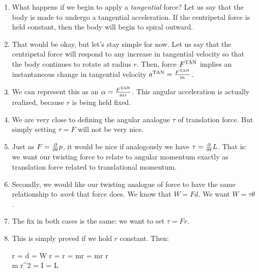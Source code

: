 \begin{enumerate}

  \item What happens if we begin to apply a \emph{tangential} force? Let
  us say that the body is made to undergo a tangential acceleration. If
  the centripetal force is held constant, then the body will begin to
  spiral outward.

  \item That would be okay, but let's stay simple for now. Let us say
  that the centripetal force will respond to any increase in tangential
  velocity so that the body continues to rotate at radius $r$. Then,
  force $F^{\text{TAN}}$ implies an instantaneous change in tangential velocity
  $a^{\text{TAN}} = \frac{F^{\text{TAN}}}{m}$.

  \item We can represent this as an 
  $\alpha = \frac{F^{\text{TAN}}}{mr}$. This angular acceleration is actually
  realized, because $r$ is being held fixed.

  \item We are very close to defining the angular analogue $\tau$ of
  translation force. But simply setting $\tau = F$ will not be very
  nice.

  \item Just as $F = \frac{\partial }{\partial t} p$, it would be nice if analogously we
  have $\tau = \frac{\partial }{\partial t} L$. That is: we want our twisting force to
  relate to angular momentum exactly as translation force related to
  translational momentum.

  \item Secondly, we would like our twisting analogue of force to have
  the same relationship to \emph{work} that force does. We know that $W
  = Fd$. We want $W = \tau \theta$.

  \item The fix in both cases is the same: we want to set $\tau = Fr$.

  \item This is simply proved if we hold $r$ constant. Then:

  \begin{nedqn}
    \tau \theta
  \eqcol
    \Ftan r \theta = \Ftan d = W
    \tau
  \eqcol
    \Ftan r =  r = mr  \vtan = mr  r\omega
  \\
  \eqcol
     m r^2 \omega =  I \omega =  L
  \end{nedqn}


\end{enumerate}

